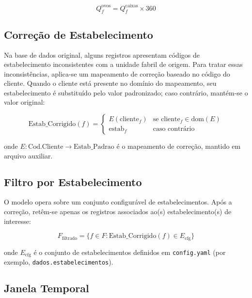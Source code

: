 \documentclass[11pt,a4paper]{article}
\begin{document}
\begin{equation}\label{eq:auto:006}
Q_f^{\text{ovos}} = Q_f^{\text{caixas}} \times 360
\end{equation}

\subsection{Correção de Estabelecimento}

Na base de dados original, alguns registros apresentam códigos de
estabelecimento inconsistentes com a unidade fabril de origem. Para tratar
essas inconsistências, aplica-se um mapeamento de correção baseado no código do
cliente. Quando o cliente está presente no domínio do mapeamento, seu
estabelecimento é substituído pelo valor padronizado; caso contrário, mantém-se
o valor original:

\begin{equation}\label{eq:auto:007}
\text{Estab\_Corrigido}(f) = \begin{cases}
E(\text{cliente}_f) & \text{se } \text{cliente}_f \in \text{dom}(E) \\
\text{estab}_f & \text{caso contrário}
\end{cases}
\end{equation}

onde $E: \text{Cod.Cliente} \rightarrow \text{Estab\_Padrao}$ é o mapeamento de
correção, mantido em arquivo auxiliar.

\subsection{Filtro por Estabelecimento}

O modelo opera sobre um conjunto configurável de estabelecimentos. Após a
correção, retêm-se apenas os registros associados ao(s) estabelecimento(s) de
interesse:

\begin{equation}\label{eq:auto:008}
F_{\text{filtrado}} = \{f \in F : \text{Estab\_Corrigido}(f) \in E_{\text{cfg}}\}
\end{equation}

onde $E_{\text{cfg}}$ é o conjunto de estabelecimentos definidos em
\texttt{config.yaml} (por exemplo, \texttt{dados.estabelecimentos}).

\subsection{Janela Temporal}
\end{document}
